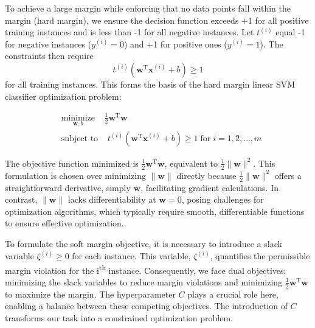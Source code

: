\documentclass[12pt,letter]{article}
\begin{document}
To achieve a large margin while enforcing that no data points fall within the margin (hard margin), we ensure the decision function exceeds +1 for all positive training instances and is less than -1 for all negative instances. Let $t^{(i)}$ equal -1 for negative instances ($y^{(i)} = 0$) and +1 for positive ones ($y^{(i)} = 1$). The constraints then require
\begin{equation}
t^{(i)}(\textbf{w}^\text{T} \textbf{x}^{(i)} + b) \geq 1
\end{equation}
for all training instances. This forms the basis of the hard margin linear SVM classifier optimization problem:

\begin{equation}
\begin{split}
    & \underset{\textbf{w}, b}{\text{minimize}} \;\;\;\; \frac{1}{2}\textbf{w}^\text{T}\textbf{w} \\
    & \text{subject to} \;\;\;\; t^{(i)}(\textbf{w}^\text{T}\textbf{x}^{(i)} + b) \ge 1 \; \text{for} \; i = 1, 2, \ldots, m
\end{split}
\end{equation}


\begin{mdframed}[middlelinewidth=0.5mm]
\begin{center}
\end{center}
The objective function minimized is $\frac{1}{2}\textbf{w}^\text{T}\textbf{w}$, equivalent to $\frac{1}{2}\|\textbf{w}\|^2$. This formulation is chosen over minimizing $\|\textbf{w}\|$ directly because $\frac{1}{2}\|\textbf{w}\|^2$ offers a straightforward derivative, simply $\textbf{w}$, facilitating gradient calculations. In contrast, $\|\textbf{w}\|$ lacks differentiability at $\textbf{w} = 0$, posing challenges for optimization algorithms, which typically require smooth, differentiable functions to ensure effective optimization.
\end{mdframed}

To formulate the soft margin objective, it is necessary to introduce a slack variable $\zeta^{(i)} \geq 0$ for each instance. This variable, $\zeta^{(i)}$, quantifies the permissible margin violation for the i\textsuperscript{th} instance. Consequently, we face dual objectives: minimizing the slack variables to reduce margin violations and minimizing $\frac{1}{2}\textbf{w}^\text{T}\textbf{w}$ to maximize the margin. The hyperparameter $C$ plays a crucial role here, enabling a balance between these competing objectives. The introduction of $C$ transforms our task into a constrained optimization problem.
\end{document}
